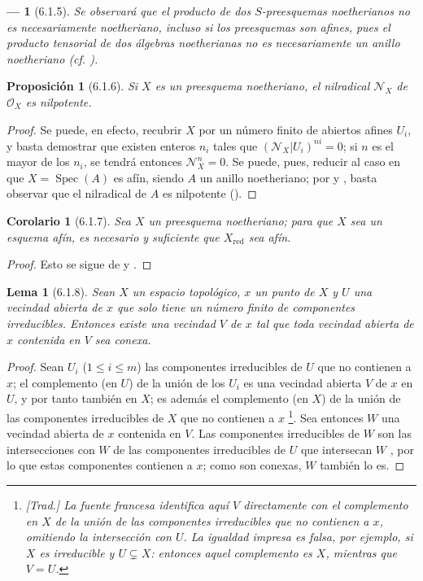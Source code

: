 \documentclass[oneside]{amsart}
\theoremstyle{ega-env-style}
\newtheorem*{env}{---}
\theoremstyle{ega-thm-env-style}
\newtheorem*{proposition}{Proposición}
\newtheorem*{lemma}{Lema}
\newtheorem*{corollary}{Corolario}
\theoremstyle{ega-defn-env-style}
\def\leq{\leqslant}                 %
\let\EGAOriginalLabel\label
\renewcommand{\label}[1]{\phantomsection\EGAOriginalLabel{#1}}
\begin{document}
\begin{env}[6.1.5]
\label{I.6.1.5}
Se observará que el \emph{producto} de dos $S$-preesquemas noetherianos no es necesariamente noetheriano, incluso si los preesquemas son afines, pues el producto tensorial de dos álgebras noetherianas no es necesariamente un anillo noetheriano (cf. ).
\end{env}

\begin{proposition}[6.1.6]
\label{I.6.1.6}
Si $X$ es un preesquema noetheriano, el nilradical $\mathscr{N}_X$ de $\mathscr{O}_X$ es nilpotente.
\end{proposition}

\begin{proof}
Se puede, en efecto, recubrir $X$ por un número finito de abiertos afines $U_i$, y basta demostrar que existen enteros $n_i$ tales que $(\mathscr{N}_X|U_i)^{ni}=0$;
si $n$ es el mayor de los $n_i$, se tendrá entonces $\mathscr{N}_X^n=0$.
Se puede, pues, reducir al caso en que $X=\operatorname{Spec}(A)$ es afín, siendo $A$ un anillo noetheriano;
por  y , basta observar que el nilradical de $A$ es nilpotente (\cite[p.~127, cor.~4]{I-11}).
\end{proof}

\begin{corollary}[6.1.7]
\label{I.6.1.7}
Sea $X$ un preesquema noetheriano;
para que $X$ sea un esquema afín, es necesario y suficiente que $X_{\mathrm{red}}$ sea afín.
\end{corollary}

\begin{proof}
Esto se sigue de  y .
\end{proof}

\begin{lemma}[6.1.8]
\label{I.6.1.8}
Sean $X$ un espacio topológico, $x$ un punto de $X$ y $U$ una vecindad abierta de $x$ que solo tiene un número finito de componentes irreducibles.
Entonces existe una vecindad $V$ de $x$ tal que toda vecindad abierta de $x$ contenida en $V$ sea conexa.
\end{lemma}

\begin{proof}
Sean $U_i$ ($1\leq i\leq m$) las componentes irreducibles de $U$ que no contienen a $x$;
el complemento (en $U$) de la unión de los $U_i$ es una vecindad abierta $V$ de $x$ en $U$, y por tanto también en $X$;
es además el complemento (en $X$) de la unión de las componentes irreducibles de $X$ que no contienen a $x$ \footnote{\emph{[Trad.] La fuente francesa identifica aquí $V$ directamente con el complemento en $X$ de la unión de las componentes irreducibles que no contienen a $x$, omitiendo la intersección con $U$. La igualdad impresa es falsa, por ejemplo, si $X$ es irreducible y $U\subsetneq X$: entonces aquel complemento es $X$, mientras que $V=U$.}}.
Sea entonces $W$ una vecindad abierta de $x$ contenida en $V$.
Las componentes irreducibles de $W$ son las intersecciones con $W$ de las componentes irreducibles de $U$ que intersecan $W$ , por lo que estas componentes contienen a $x$;
como son conexas, $W$ también lo es.
\end{proof}
\end{document}
